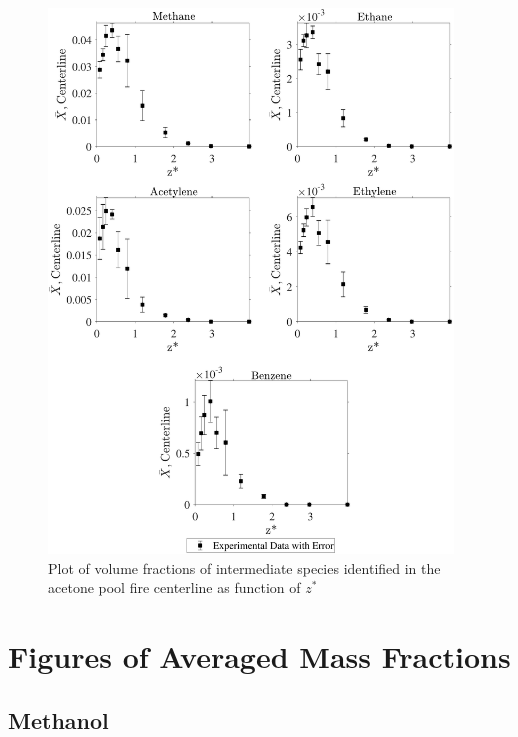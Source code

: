 \documentclass[12pt]{article}
\begin{document}
\begin{figure}[!h]
	\centering
\includegraphics[width=10.75cm,keepaspectratio]{Acetone_Inter_MOL_FRAC_Plot.pdf}
	\caption[Volume fractions of intermediate species in the acetone plume]{Plot of volume fractions of intermediate species identified in the acetone pool fire centerline as function of $z^{*}$}
	\label{fig:Acetone_VOL_Frac_Inter}
\end{figure}

\clearpage

\section{Figures of Averaged Mass Fractions}\label{sec:Mix_Frac_Figs}

\subsection{Methanol}
\label{ssec:Methanol_ALL_Mix_Frac}
\end{document}

